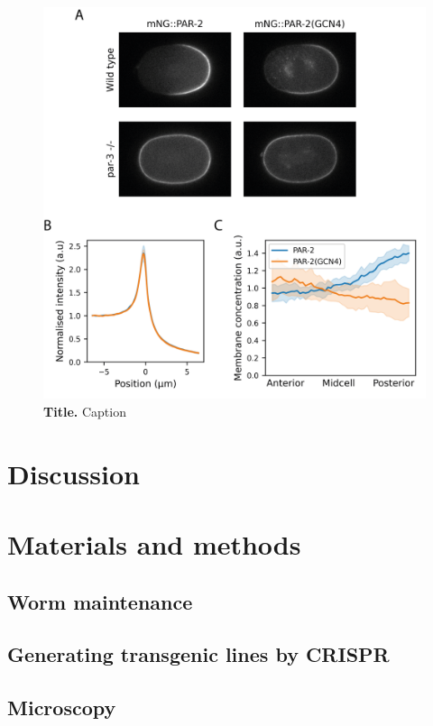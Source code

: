 \documentclass[12pt]{"article"}
\newcommand{\mycaption}[2]{\caption[#1]{\textbf{#1.} #2}}
\begin{document}
\begin{figure}[!h]
\includegraphics[scale=1]{gcn4_par3mut}
\setlength{\abovecaptionskip}{20pt}
\centering
\mycaption{Title}{Caption}
\end{figure}




\clearpage
\section{Discussion}


\clearpage
\section{Materials and methods}


\subsection{Worm maintenance}
\subsection{Generating transgenic lines by CRISPR}
\subsection{Microscopy}
\end{document}
